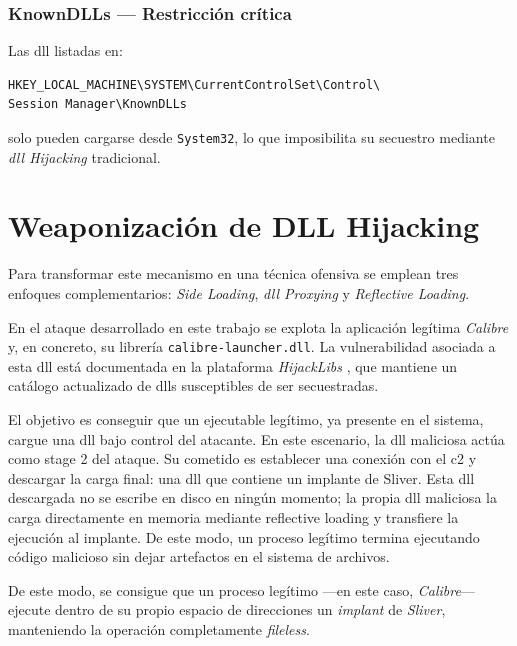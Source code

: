 \subsubsection{KnownDLLs — Restricción crítica}

Las \acrshort{dll} listadas en:

\begin{verbatim}
HKEY_LOCAL_MACHINE\SYSTEM\CurrentControlSet\Control\
Session Manager\KnownDLLs
\end{verbatim}

solo pueden cargarse desde \texttt{System32}, lo que imposibilita su secuestro mediante \textit{\acrshort{dll} Hijacking} tradicional.

\section{Weaponización de DLL Hijacking} \label{sec:weaponizacion-dll}
\label{sec:dll-hijacking}

Para transformar este mecanismo en una técnica ofensiva se emplean tres enfoques complementarios: \textit{Side Loading}, \textit{\acrshort{dll} Proxying} y \textit{Reflective Loading}.

En el ataque desarrollado en este trabajo se explota la aplicación legítima \textit{Calibre} y, en concreto, su librería \texttt{calibre-launcher.dll}. La vulnerabilidad asociada a esta \acrshort{dll} está documentada en la plataforma \textit{HijackLibs} \cite{hijacklibs-calibre-launcher}, que mantiene un catálogo actualizado de \acrshort{dll}s susceptibles de ser secuestradas.

El objetivo es conseguir que un ejecutable legítimo, ya presente en el sistema, cargue una \acrshort{dll} bajo control del atacante. En este escenario, la \acrshort{dll} maliciosa actúa como stage 2 del ataque. Su cometido es establecer una conexión con el \acrshort{c2} y descargar la carga final: una \acrshort{dll} que contiene un implante de Sliver. Esta \acrshort{dll} descargada no se escribe en disco en ningún momento; la propia \acrshort{dll} maliciosa la carga directamente en memoria mediante reflective loading y transfiere la ejecución al implante. De este modo, un proceso legítimo termina ejecutando código malicioso sin dejar artefactos en el sistema de archivos.

De este modo, se consigue que un proceso legítimo —en este caso, \textit{Calibre}— ejecute dentro de su propio espacio de direcciones un \textit{implant} de \textit{Sliver}, manteniendo la operación completamente \textit{fileless}.

